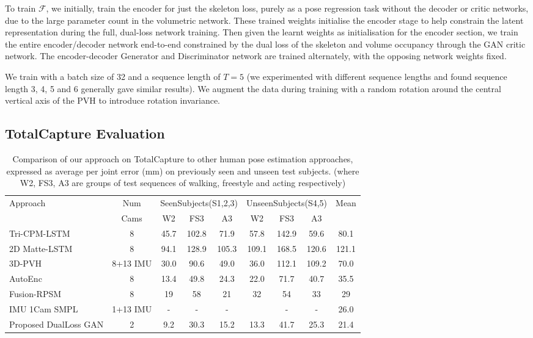 \documentclass{bmvc2k}
\newcommand{\squeezeup}{\vspace{-2mm}}
\begin{document}
To train $\mathcal{F}$, 
we initially, train the encoder for just the skeleton loss, purely as a pose regression task without the decoder or critic networks, due to the large parameter count in the volumetric network. These trained weights initialise the encoder stage to help constrain the latent representation during the full, dual-loss network training. Then given the learnt weights as initialisation for the encoder section, we train the entire encoder/decoder network end-to-end constrained by the dual loss of the skeleton and volume occupancy through the GAN critic network. The encoder-decoder Generator and Discriminator network are trained alternately, with the opposing network weights fixed. 


We train with a batch size of 32 and a sequence length of $T=5$ (we experimented with different sequence lengths and found sequence length 3, 4, 5 and 6 generally gave similar results). We augment the data during training with a random rotation around the central vertical axis of the PVH to introduce rotation invariance. 
\squeezeup
\squeezeup

\subsection{TotalCapture Evaluation}
\begin{table*}[htb]
\centering
{
\small
\begin{tabular}{lcccccccc}
\hline
Approach &                              Num    &\multicolumn{3}{c}{SeenSubjects(S1,2,3)}&\multicolumn{3}{c}{UnseenSubjects(S4,5)} & Mean \\
                                         &Cams& W2 & FS3 & A3 & W2 & FS3 & A3 & \\ \hline
Tri-CPM-LSTM~\cite{cao2016realtimeCPM}   & 8  & 45.7 &102.8 & 71.9& 57.8 & 142.9 & 59.6 & 80.1 \\ 
2D Matte-LSTM~\cite{TrumbleCVMP2DConvNet}& 8  & 94.1 &128.9  &105.3 & 109.1& 168.5&120.6&121.1 \\ 
3D-PVH~\cite{trumble_total_2017}         & 8+13 IMU& 30.0 & 90.6 & 49.0 & 36.0 & 112.1 & 109.2 & 70.0 \\ 
AutoEnc~\cite{trumble:eccv:2018}         & 8 & 13.4 & 49.8 & 24.3 & 22.0 & 71.7 & 40.7 & 35.5 \\ 
Fusion-RPSM~\cite{Qiu:iccv:2019}         & 8 & 19   &58    &21    &32    &54    &33   & 29 \\
IMU 1Cam SMPL~\cite{PonsECCV18}          &1+13 IMU& -    &   -  &  -   &      &  -   &   -  & 26.0 \\ \hline
Proposed DualLoss GAN                    & 2 & 9.2 & 30.3 & 15.2 & 13.3 & 41.7 & 25.3 & 21.4 \\ \hline
\end{tabular}
}
\caption{Comparison of our approach on  TotalCapture  to other human pose estimation approaches, expressed as average per joint error (mm) on previously seen and unseen test subjects. (where W2, FS3, A3 are groups of test sequences of walking, freestyle and acting respectively)}
\label{tab:totalcaptureResults}
\squeezeup
\end{table*}
\label{sec:TCEval}
\end{document}
